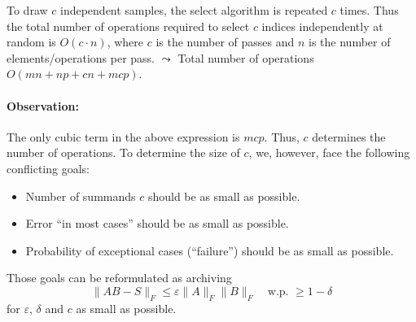 To draw $c$ independent samples, the select algorithm is repeated $c$ times. Thus the total number of operations required to select $c$ indices independently at random is $O(c \cdot n)$, where $c$ is the number of passes and $n$ is the number of elements/operations per pass. $\leadsto$ Total number of operations $O(mn + np + cn +mcp)$.
\paragraph{Observation:} The only cubic term in the above expression is $m c  p$. Thus, $c$ determines the number of operations. To determine the size of $c$, we, however, face the following conflicting goals: \vspace{-0.5pc}
\begin{itemize}[-,itemsep=0pt]
	\item Number of summands $c$ should be as small as possible.
	\item Error ``in most cases'' should be as small as possible.
	\item Probability of exceptional cases (``failure'') should be as small as possible.
\end{itemize}
Those goals can be reformulated as archiving 
\begin{equation}
\|AB-S\|_F \leq \varepsilon \|A\|_F \|B\|_F \quad \text{w.p. } \geq 1-\delta
\end{equation}
for $\varepsilon$, $\delta$ and $c$ as small as possible.
